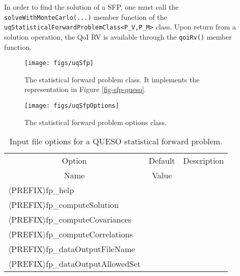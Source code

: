 In order to find the solution of a SFP, one must call the \verb+solveWithMonteCarlo(...)+ member function of the \verb+uqStatisticalForwardProblemClass<P_V,P_M>+ class.
Upon return from a solution operation, the QoI RV is available through the \verb+qoiRv()+ member function.

\begin{figure}[h!]
\centerline{
\texttt{[image: figs/uqSfp]}
}
\caption{
The statistical forward problem class. It implements the representation in Figure \ref{fig-sfp-queso}.
}
\label{fig-sfp-class}
\end{figure}

\begin{figure}[h!]
\begin{center}
\texttt{[image: figs/uqSfpOptions]}
\end{center}
\caption{
The statistical forward problem options class.
}
\label{fig-sfp-options-class}
\end{figure}

\begin{table}[!h]
\begin{center}
\begin{tabular}{|l|c|c|}
\hline
\multicolumn{1}{|c|}{Option}                     & Default & Description \\
\multicolumn{1}{|c|}{Name}                       & Value   &             \\
\hline
\hline
$\langle$PREFIX$\rangle$fp\_help                 &         &             \\
\hline
$\langle$PREFIX$\rangle$fp\_computeSolution      &         &             \\
\hline
$\langle$PREFIX$\rangle$fp\_computeCovariances   &         &             \\
\hline
$\langle$PREFIX$\rangle$fp\_computeCorrelations  &         &             \\
\hline
$\langle$PREFIX$\rangle$fp\_dataOutputFileName   &         &             \\
\hline
$\langle$PREFIX$\rangle$fp\_dataOutputAllowedSet &         &             \\
\hline
\end{tabular}
\end{center}
\caption{
Input file options for a QUESO statistical forward problem.
}
\label{tab-sfp-options}
\end{table}

